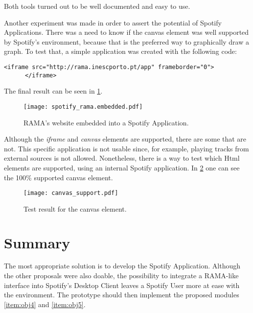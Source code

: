     Both tools turned out to be well documented and easy to use.

    Another experiment was made in order to assert the potential of Spotify Applications.
    There was a need to know if the canvas element was well supported by Spotify's environment, because that is the preferred way to graphically draw a graph.
    To test that, a simple application was created with the following code:

    \begin{lstlisting}[caption={\emph{iframe} element that allows to embed RAMA's website into the application.}, style=htmlcssjs]
      <iframe src="http://rama.inescporto.pt/app" frameborder="0">
      </iframe>\end{lstlisting}

    The final result can be seen in \ref{fig:rama_spotifyed}.
    \begin{figure}
      \begin{center}
        \texttt{[image: spotify\_rama.embedded.pdf]}
      \end{center}
      \caption{RAMA's website embedded into a Spotify Application.}
      \label{fig:rama_spotifyed}
    \end{figure}
    Although the \emph{iframe} and \emph{canvas} elements are supported, there are some that are not.
    This specific application is not usable since, for example, playing tracks from external sources is not allowed.
    Nonetheless, there is a way to test which Html elements are supported, using an internal Spotify application.
    In \ref{fig:canvas_support} one can see the 100\% supported canvas element.

    \begin{figure}[H]
       \begin{center}
         \texttt{[image: canvas\_support.pdf]}
       \end{center}
       \caption{Test result for the canvas element.}
       \label{fig:canvas_support}
     \end{figure}



\section{Summary}

  The most appropriate solution is to develop the Spotify Application.
  Although the other proposals were also doable, the possibility to integrate a RAMA-like interface into Spotify's Desktop Client leaves a Spotify User more at ease with the environment.
  The prototype should then implement the proposed modules \ref{item:obj4} and \ref{item:obj5}.